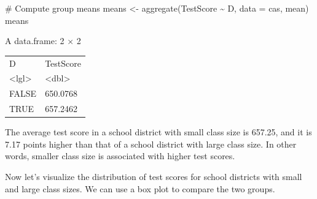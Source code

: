\documentclass[
  12pt,
  a4paper,
]{scrbook}
\newenvironment{Shaded}{\begin{snugshade}}{\end{snugshade}}
\newcommand{\AttributeTok}[1]{\textcolor[rgb]{0.40,0.45,0.13}{#1}}
\newcommand{\CommentTok}[1]{\textcolor[rgb]{0.37,0.37,0.37}{#1}}
\newcommand{\DecValTok}[1]{\textcolor[rgb]{0.68,0.00,0.00}{#1}}
\newcommand{\FunctionTok}[1]{\textcolor[rgb]{0.28,0.35,0.67}{#1}}
\newcommand{\NormalTok}[1]{\textcolor[rgb]{0.00,0.23,0.31}{#1}}
\newcommand{\OtherTok}[1]{\textcolor[rgb]{0.00,0.23,0.31}{#1}}
\newcommand{\SpecialCharTok}[1]{\textcolor[rgb]{0.37,0.37,0.37}{#1}}
\theoremstyle{plain}
\theoremstyle{definition}
\theoremstyle{remark}
\begin{document}
\begin{Shaded}
\end{Shaded}

\begin{Shaded}
\begin{Highlighting}[]
\CommentTok{\# Compute group means}
\NormalTok{means }\OtherTok{\textless{}{-}} \FunctionTok{aggregate}\NormalTok{(TestScore }\SpecialCharTok{\textasciitilde{}}\NormalTok{ D, }\AttributeTok{data =}\NormalTok{ cas, mean)}
\NormalTok{means}
\end{Highlighting}
\end{Shaded}

A data.frame: 2 × 2
\begin{tabular}{ll}
 D & TestScore\\
 <lgl> & <dbl>\\
\hline
     FALSE & 650.0768\\
      TRUE & 657.2462\\
\end{tabular}

The average test score in a school district with small class size is
657.25, and it is 7.17 points higher than that of a school district with
large class size. In other words, smaller class size is associated with
higher test scores.

Now let's visualize the distribution of test scores for school districts
with small and large class sizes. We can use a box plot to compare the
two groups.
\end{document}
